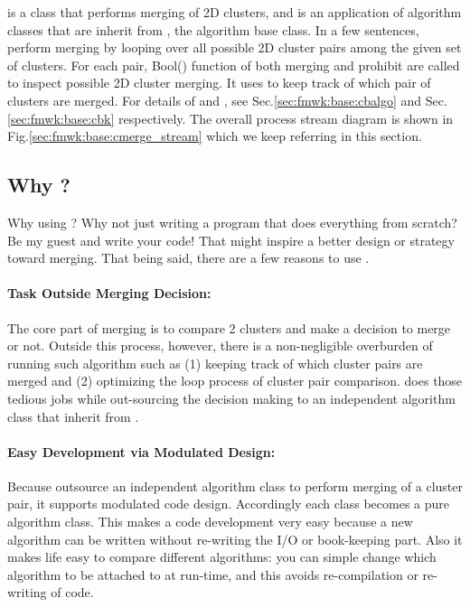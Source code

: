 
{\cmerge} is a {\CPP} class that performs merging of 2D clusters, and is an application of {\cmalgo} algorithm classes that are inherit from {\cbalgo}, the algorithm base class. In a few sentences, {\cmerge} perform merging by looping over all possible 2D cluster pairs among the given set of clusters. For each pair, {\ttfamily Bool()} function of both merging and prohibit {\cmalgo} are called to inspect possible 2D cluster merging. It uses {\cbkeeper} to keep track of which pair of clusters are merged. For details of {\cbalgo} and {\cbkeeper}, see Sec.\ref{sec:fmwk:base:cbalgo} and Sec.\ref{sec:fmwk:base:cbk} respectively. The overall process stream diagram is shown in Fig.\ref{sec:fmwk:base:cmerge_stream} which we keep referring in this section.

\subsection{Why {\cmerge}?}
Why using {\cmerge}? Why not just writing a program that does everything from scratch?
Be my guest and write your code! That might inspire a better design or strategy toward merging. 
That being said, there are a few reasons to use {\cmerge}.

\paragraph{Task Outside Merging Decision:}
{\cmerge} The core part of merging is to compare 2 clusters and make a decision to merge or not. Outside this process, however, there is a non-negligible overburden of running such algorithm such as (1) keeping track of which cluster pairs are merged and (2) optimizing the loop process of cluster pair comparison. {\cmerge} does those tedious jobs while out-sourcing the decision making to an independent {\CPP} algorithm class that inherit from {\cbalgo}. 

\paragraph{Easy Development via Modulated Design:}
Because {\cmerge} outsource an independent algorithm class to perform merging of a cluster pair, it supports modulated code design. Accordingly each {\cmalgo} class becomes a pure algorithm class. This makes a code development very easy because a new algorithm can be written without re-writing the I/O or book-keeping part. Also it makes life easy to compare different algorithms: you can simple change which algorithm to be attached to {\cmerge} at run-time, and this avoids re-compilation or re-writing of code.


